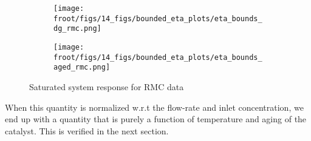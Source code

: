 \begin{figure}[H]
        \begin{minipage}{0.49\textwidth}
                \begin{figure}[H]
                        \centering
                        \texttt{[image: \\froot/figs/14\_figs/bounded\_eta\_plots/eta\_bounds\_dg\_rmc.png]}
                \end{figure}
        \end{minipage}
        \begin{minipage}{0.49\textwidth}
                \begin{figure}[H]
                        \centering
                        \texttt{[image: \\froot/figs/14\_figs/bounded\_eta\_plots/eta\_bounds\_aged\_rmc.png]}
                \end{figure}
        \end{minipage}
        \caption{Saturated system response for RMC data}
\end{figure}


When this quantity is normalized w.r.t the flow-rate and inlet concentration, we end up with a quantity that is purely a function of temperature  and aging of the catalyst. This is verified in the next section.
